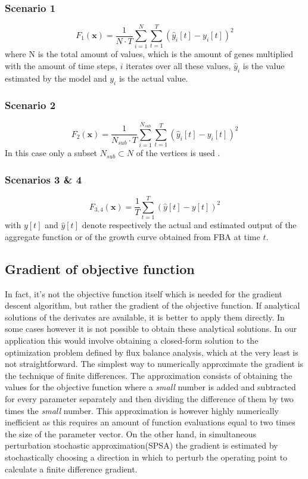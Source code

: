  \subsubsection{Scenario 1}
 \begin{equation}
  F_{1}(\mathbf{x}) = \frac{1}{N\cdot T} \sum_{i=1}^N\sum_{t=1}^T(\hat{y}_i[t] - y_i[t])^2
 \end{equation}
 where N is the total amount of values, which is the amount of genes multiplied with the amount of time steps, $i$ iterates
 over all these values, $\hat{y}_i$ is the value estimated by the model and $y_i$ is the actual value.
 \subsubsection{Scenario 2}
 \begin{equation}
  F_{2}(\mathbf{x})  = \frac{1}{N_{sub}\cdot T} \sum_{i=1}^{N_{sub}}\sum_{t=1}^T(\hat{y}_i[t] - y_i[t])^2
 \end{equation}
 In this case only a subset $N_{sub} \subset N$ of the vertices is used .
 \subsubsection{Scenarios 3 \& 4}
 \begin{equation}
 F_{3,4}(\mathbf{x}) = \frac{1}{T} \sum_{t=1}^T(\hat{y}[t] - y[t])^2
 \end{equation}
 with $y[t]$ and $\hat{y}[t]$ denote respectively the actual and estimated output of the aggregate function or of the growth curve obtained from FBA at time $t$.
 
\subsection{Gradient of objective function}
In fact, it's not the objective function itself which is needed for the gradient descent algorithm, but rather the gradient of the objective function. If analytical solutions of the derivates
are available, it is better to apply them directly. In some cases however it is not possible to obtain these analytical solutions. In our application this would involve obtaining a closed-form solution
to the optimization problem defined by flux balance analysis, which at the very least is not straightforward. The simplest way to numerically approximate the gradient is the technique of finite differences. 
The approximation consists of obtaining the values for the objective function where a \textit{small} number is added and subtracted for every parameter separately and then dividing the difference of them by two times the \textit{small} number.
This approximation is however highly numerically inefficient as this requires an amount of function evaluations equal to two times the size of the parameter vector.
On the other hand, in simultaneous perturbation stochastic approximation(SPSA)\cite{hazen2009gradient} the gradient is estimated by stochastically choosing a direction
in which to perturb the operating point to calculate a finite difference gradient. 

